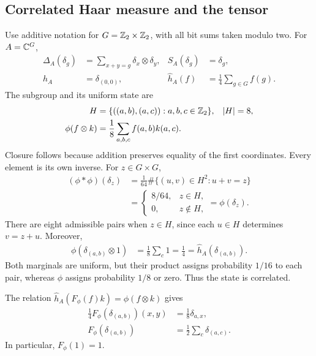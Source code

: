 \documentclass[aps,pra,reprint,nofootinbib,onecolumn]{revtex4-2}
\begin{document}
\subsection{Correlated Haar measure and the tensor}

Use additive notation for $G=\mathbb{Z}_2\times\mathbb{Z}_2$, with all bit sums taken
modulo two. For $A=\mathbb{C}^G$,
\begin{align}
	\Delta_A(\delta_g) & =\sum_{x+y=g}\delta_x\otimes\delta_y,
	                   &
	S_A(\delta_g)      & =\delta_g,
	\\
	h_A                & =\delta_{(0,0)},
	                   &
	\hat h_A(f)        & =\frac14\sum_{g\in G}f(g).
\end{align}
The subgroup and its uniform state are
\begin{align}
	H                & =\{((a,b),(a,c)):a,b,c\in\mathbb{Z}_2\},
	                 &
	|H|              & =8,
	\\
	\phi(f\otimes k) & =\frac18\sum_{a,b,c}f(a,b)k(a,c).
	\label{eq:subgroup}
\end{align}
Closure follows because addition preserves equality of the first
coordinates. Every element is its own inverse. For $z\in G\times G$,
\begin{align}
	(\phi*\phi)(\delta_z)
	 & =\frac1{64}\#\{(u,v)\in H^2:u+v=z\}
	\\
	 & =\begin{cases}8/64,&z\in H,\\0,&z\notin H,\end{cases}
	=\phi(\delta_z).
\end{align}
There are eight admissible pairs when $z\in H$, since each $u\in H$
determines $v=z+u$. Moreover,
\begin{align}
	\phi(\delta_{(a,b)}\otimes1)
	 & =\frac18\sum_c1=\frac14
	=\hat h_A(\delta_{(a,b)}).
\end{align}
Both marginals are uniform, but their product assigns probability
$1/16$ to each pair, whereas $\phi$ assigns probability $1/8$ or zero.
Thus the state is correlated.

The relation $\hat h_A(F_\phi(f)k)=\phi(f\otimes k)$ gives
\begin{align}
	\frac14F_\phi(\delta_{(a,b)})(x,y)
	 & =\frac18\delta_{a,x},
	\\
	F_\phi(\delta_{(a,b)})
	 & =\frac12\sum_c\delta_{(a,c)}.
	\label{eq:Fgroup}
\end{align}
In particular, $F_\phi(1)=1$.
\end{document}
